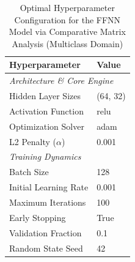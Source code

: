 \begin{table}[H]
    \centering
    \caption{Optimal Hyperparameter Configuration for the FFNN Model via Comparative Matrix Analysis (Multiclass Domain)}
    \label{tab:comparator_ffnn_hyperparameters}
    \small
    \begin{tabular}{ll}
    \toprule
    \textbf{Hyperparameter} & \textbf{Value} \\
    \midrule
    \multicolumn{2}{l}{\textit{Architecture \& Core Engine}} \\
    Hidden Layer Sizes & (64, 32) \\
Activation Function & relu \\
Optimization Solver & adam \\
L2 Penalty ($\alpha$) & 0.001 \\
\midrule
    \multicolumn{2}{l}{\textit{Training Dynamics}} \\
    Batch Size & 128 \\
Initial Learning Rate & 0.001 \\
Maximum Iterations & 100 \\
Early Stopping & True \\
Validation Fraction & 0.1 \\
Random State Seed & 42 \\
\bottomrule
    \end{tabular}
    \end{table}
    